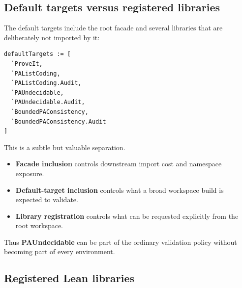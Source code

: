 \documentclass[
  10pt,
  a4paper,
  twoside,
  open=any,
  parskip=half,
  headings=big
]{scrreprt}
\newcommand{\code}[1]{\texttt{\detokenize{#1}}}
\newcommand{\project}[1]{\textsf{\bfseries #1}}
\begin{document}
\subsection{Default targets versus registered libraries}

The default targets include the root facade and several libraries that are
deliberately not imported by it:

\begin{lstlisting}[language={},caption={Conceptual form of the root default-target set.}]
defaultTargets := [
  `ProveIt,
  `PAListCoding,
  `PAListCoding.Audit,
  `PAUndecidable,
  `PAUndecidable.Audit,
  `BoundedPAConsistency,
  `BoundedPAConsistency.Audit
]
\end{lstlisting}

This is a subtle but valuable separation.

\begin{itemize}
  \item \textbf{Facade inclusion} controls downstream import cost and namespace
        exposure.
  \item \textbf{Default-target inclusion} controls what a broad workspace
        build is expected to validate.
  \item \textbf{Library registration} controls what can be requested
        explicitly from the root workspace.
\end{itemize}

Thus \project{PAUndecidable} can be part of the ordinary validation policy
without becoming part of every \code{import ProveIt} environment.

\subsection{Registered Lean libraries}
\end{document}
